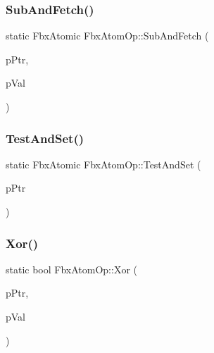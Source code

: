 \mbox{\label{class_fbx_atom_op_a3e22bd134a890d48dc95d28744ca4e46}} 
\subsubsection{\texorpdfstring{Sub\+And\+Fetch()}{SubAndFetch()}}
{\footnotesize\ttfamily static Fbx\+Atomic Fbx\+Atom\+Op\+::\+Sub\+And\+Fetch (\begin{DoxyParamCaption}\item[{volatile Fbx\+Atomic $\ast$}]{p\+Ptr,  }\item[{Fbx\+Atomic}]{p\+Val }\end{DoxyParamCaption})\hspace{0.3cm}{\ttfamily [static]}}

\mbox{\label{class_fbx_atom_op_af84c36d501a05600e44f4ef6a3477d2a}} 
\subsubsection{\texorpdfstring{Test\+And\+Set()}{TestAndSet()}}
{\footnotesize\ttfamily static Fbx\+Atomic Fbx\+Atom\+Op\+::\+Test\+And\+Set (\begin{DoxyParamCaption}\item[{volatile Fbx\+Atomic $\ast$}]{p\+Ptr }\end{DoxyParamCaption})\hspace{0.3cm}{\ttfamily [static]}}

\mbox{\label{class_fbx_atom_op_a30a91a335e4ccf4b40a4681697ea2478}} 
\subsubsection{\texorpdfstring{Xor()}{Xor()}}
{\footnotesize\ttfamily static bool Fbx\+Atom\+Op\+::\+Xor (\begin{DoxyParamCaption}\item[{volatile Fbx\+Atomic $\ast$}]{p\+Ptr,  }\item[{Fbx\+Atomic}]{p\+Val }\end{DoxyParamCaption})\hspace{0.3cm}{\ttfamily [static]}}

